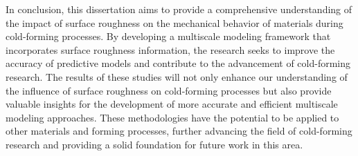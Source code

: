 In conclusion, this dissertation aims to provide a comprehensive understanding of the impact of surface roughness on the mechanical behavior of materials during cold-forming processes. By developing a multiscale modeling framework that incorporates surface roughness information, the research seeks to improve the accuracy of predictive models and contribute to the advancement of cold-forming research. The results of these studies will not only enhance our understanding of the influence of surface roughness on cold-forming processes but also provide valuable insights for the development of more accurate and efficient multiscale modeling approaches. These methodologies have the potential to be applied to other materials and forming processes, further advancing the field of cold-forming research and providing a solid foundation for future work in this area.
